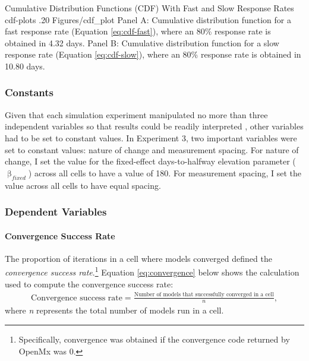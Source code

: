 \documentclass[
12pt, %
twoside,
english]{guelphthesis}
\begin{document}
\begin{apaFigure}
[portrait]
[samepage]
[0cm]
{Cumulative Distribution Functions (CDF) With Fast and Slow Response Rates}
{cdf-plots}
{.20}
{Figures/cdf_plot}
{Panel A: Cumulative distribution function for a fast response rate (Equation \ref{eq:cdf-fast}), where an 80\% response rate is obtained in 4.32 days. Panel B: Cumulative distribution function for a slow response rate (Equation \ref{eq:cdf-slow}), where an 80\% response rate is obtained in 10.80 days.}
\end{apaFigure}
\hypertarget{constants-1}{%
\subsubsection{Constants}\label{constants-1}}

Given that each simulation experiment manipulated no more than three independent variables so that results could be readily interpreted \autocite{halford2005}, other variables had to be set to constant values. In Experiment 3, two important variables were set to constant values: nature of change and measurement spacing. For nature of change, I set the value for the fixed-effect days-to-halfway elevation parameter (\(\upbeta_{fixed}\)) across all cells to have a value of 180. For measurement spacing, I set the value across all cells to have equal spacing.

\hypertarget{dependent-variables-2}{%
\subsubsection{Dependent Variables}\label{dependent-variables-2}}

\hypertarget{convergence-success-rate-1}{%
\paragraph{Convergence Success Rate}\label{convergence-success-rate-1}}

The proportion of iterations in a cell where models converged defined
the \emph{convergence success rate}.\footnote{Specifically, convergence was obtained if the convergence code returned by OpenMx was 0.} Equation \eqref{eq:convergence} below shows the calculation used to compute the convergence success rate:
\begin{align}
  \text{Convergence success rate} =  \frac{\text{Number of models that successfully converged in a cell}}{n},
  \label{eq:convergence} 
\end{align}
\noindent where \emph{n} represents the total number of models run in a cell.
\end{document}
